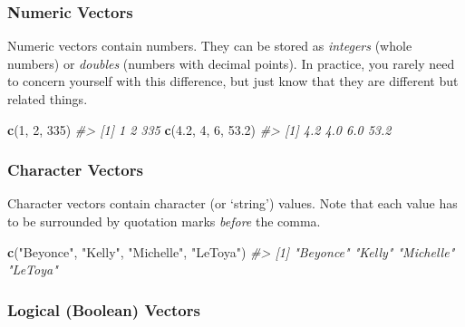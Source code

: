 \documentclass[
]{book}
\newenvironment{Shaded}{\begin{snugshade}}{\end{snugshade}}
\newcommand{\CommentTok}[1]{\textcolor[rgb]{0.56,0.35,0.01}{\textit{#1}}}
\newcommand{\DecValTok}[1]{\textcolor[rgb]{0.00,0.00,0.81}{#1}}
\newcommand{\FloatTok}[1]{\textcolor[rgb]{0.00,0.00,0.81}{#1}}
\newcommand{\KeywordTok}[1]{\textcolor[rgb]{0.13,0.29,0.53}{\textbf{#1}}}
\newcommand{\NormalTok}[1]{#1}
\newcommand{\StringTok}[1]{\textcolor[rgb]{0.31,0.60,0.02}{#1}}
\begin{document}
\hypertarget{numeric-vectors}{%
\subsubsection*{Numeric Vectors}\label{numeric-vectors}}

Numeric vectors contain numbers. They can be stored as \emph{integers} (whole numbers) or \emph{doubles} (numbers with decimal points). In practice, you rarely need to concern yourself with this difference, but just know that they are different but related things.

\begin{Shaded}
\begin{Highlighting}[]
\KeywordTok{c}\NormalTok{(}\DecValTok{1}\NormalTok{, }\DecValTok{2}\NormalTok{, }\DecValTok{335}\NormalTok{)}
\CommentTok{#> [1]   1   2 335}
\KeywordTok{c}\NormalTok{(}\FloatTok{4.2}\NormalTok{, }\DecValTok{4}\NormalTok{, }\DecValTok{6}\NormalTok{, }\FloatTok{53.2}\NormalTok{)}
\CommentTok{#> [1]  4.2  4.0  6.0 53.2}
\end{Highlighting}
\end{Shaded}

\hypertarget{character-vectors}{%
\subsubsection*{Character Vectors}\label{character-vectors}}

Character vectors contain character (or `string') values. Note that each value has to be surrounded by quotation marks \emph{before} the comma.

\begin{Shaded}
\begin{Highlighting}[]
\KeywordTok{c}\NormalTok{(}\StringTok{"Beyonce"}\NormalTok{, }\StringTok{"Kelly"}\NormalTok{, }\StringTok{"Michelle"}\NormalTok{, }\StringTok{"LeToya"}\NormalTok{)}
\CommentTok{#> [1] "Beyonce"  "Kelly"    "Michelle" "LeToya"}
\end{Highlighting}
\end{Shaded}

\hypertarget{logical-boolean-vectors}{%
\subsubsection*{Logical (Boolean) Vectors}\label{logical-boolean-vectors}}
\end{document}
